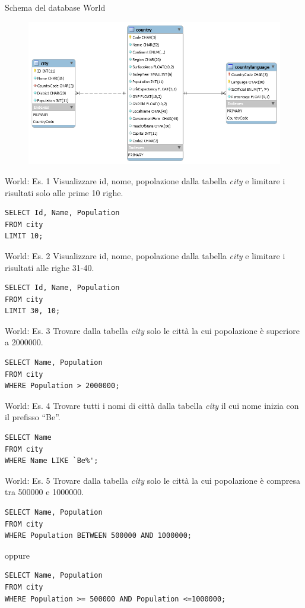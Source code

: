 \begin{frame}[fragile]{Schema del database World}
\begin{figure}
    \centering
        \includegraphics[width=.8\textwidth]{img/db-world.png}
    \end{figure}
\end{frame}
%
\begin{frame}[fragile]{World: Es. 1}
Visualizzare id, nome, popolazione dalla tabella \textit{city} e limitare i risultati solo alle prime 10 righe.
\pause
\begin{lstlisting}
SELECT Id, Name, Population
FROM city
LIMIT 10;
\end{lstlisting}
\end{frame}
%
\begin{frame}[fragile]{World: Es. 2}
Visualizzare id, nome, popolazione dalla tabella \textit{city} e limitare i risultati alle righe 31-40.
\pause
\begin{lstlisting}
SELECT Id, Name, Population
FROM city
LIMIT 30, 10;
\end{lstlisting}
\end{frame}
%
\begin{frame}[fragile]{World: Es. 3}
Trovare dalla tabella \textit{city} solo le citt\`a la cui popolazione \`e superiore a 2000000.
\pause
\begin{lstlisting}
SELECT Name, Population
FROM city
WHERE Population > 2000000;
\end{lstlisting}
\end{frame}
%
\begin{frame}[fragile]{World: Es. 4}
Trovare tutti i nomi di citt\`a dalla tabella \textit{city} il cui nome inizia con il prefisso ``Be''.
\pause
\begin{lstlisting}
SELECT Name
FROM city
WHERE Name LIKE `Be%';
\end{lstlisting}
\end{frame}
%
\begin{frame}[fragile]{World: Es. 5}
Trovare dalla tabella \textit{city} solo le citt\`a la cui popolazione \`e compresa tra 500000 e 1000000.
\pause
\begin{lstlisting}
SELECT Name, Population
FROM city
WHERE Population BETWEEN 500000 AND 1000000;
\end{lstlisting}
\pause
oppure
\begin{lstlisting}
SELECT Name, Population
FROM city
WHERE Population >= 500000 AND Population <=1000000;
\end{lstlisting}
\end{frame}

